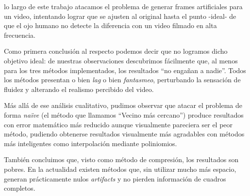  lo largo de este trabajo atacamos el problema de generar frames artificiales para un video, intentando lograr que se ajusten al original hasta el punto -ideal- de que el ojo humano no detecte la diferencia con un video filmado en alta frecuencia.

Como primera conclusión al respecto podemos decir que no logramos dicho objetivo ideal: de nuestras observaciones descubrimos fácilmente que, al menos para los tres métodos implementados, los resultados ``no engañan a nadie''. Todos los métodos presentan o bien \emph{lag} o bien \emph{fantasmeo}, perturbando la sensación de fluidez y alterando el realismo percibido del video.

Más allá de ese análisis cualitativo, pudimos observar que atacar el problema de forma \emph{naïve} (el método que llamamos ``Vecino más cercano'') produce resultados con error matemático más reducido aunque visualmente pareciera ser el peor método, pudiendo obtenerse resultados visualmente más agradables con métodos más inteligentes como interpolación mediante poliniomios.

También concluimos que, visto como método de compresión, los resultados son pobres. En la actualidad existen métodos que, sin utilizar mucho más espacio, generan prácticamente nulos \emph{artifacts} y no pierden información de cuadros completos.